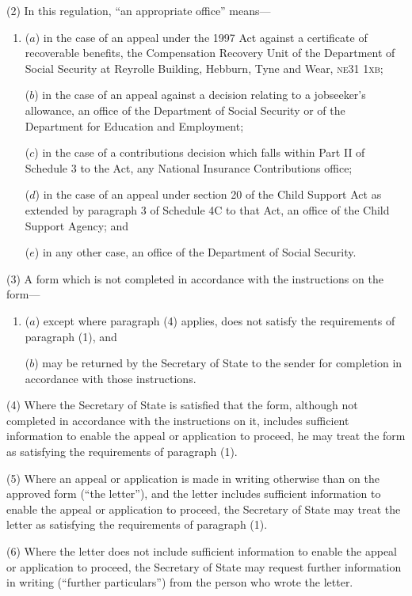 \documentclass[12pt,a4paper]{article}
\begin{document}
(2) In this regulation, “an appropriate office” means—
\begin{enumerate}\item[]
($a$) in the case of an appeal under the 1997 Act against a certificate of recoverable benefits, the Compensation Recovery Unit of the Department of Social Security at Reyrolle Building, Hebburn, Tyne and Wear, \textsc{\lowercase{NE31 1XB}};

($b$) in the case of an appeal against a decision relating to a jobseeker’s allowance, an office of the Department of Social Security or of the Department for Education and Employment;

($c$) in the case of a contributions decision which falls within Part II of Schedule 3 to the Act, any National Insurance Contributions office;

($d$) in the case of an appeal under section 20 of the Child Support Act as extended by paragraph 3 of Schedule 4C to that Act, an office of the Child Support Agency; and

($e$) in any other case, an office of the Department of Social Security.
\end{enumerate}

(3) A form which is not completed in accordance with the instructions on the form—
\begin{enumerate}\item[]
($a$) except where paragraph (4) applies, does not satisfy the requirements of paragraph (1), and

($b$) may be returned by the Secretary of State to the sender for completion in accordance with those instructions.
\end{enumerate}

(4) Where the Secretary of State is satisfied that the form, although not completed in accordance with the instructions on it, includes sufficient information to enable the appeal or application to proceed, he may treat the form as satisfying the requirements of paragraph (1).

(5) Where an appeal or application is made in writing otherwise than on the approved form (“the letter”), and the letter includes sufficient information to enable the appeal or application to proceed, the Secretary of State may treat the letter as satisfying the requirements of paragraph (1).

(6) Where the letter does not include sufficient information to enable the appeal or application to proceed, the Secretary of State may request further information in writing (“further particulars”) from the person who wrote the letter.
\end{document}
